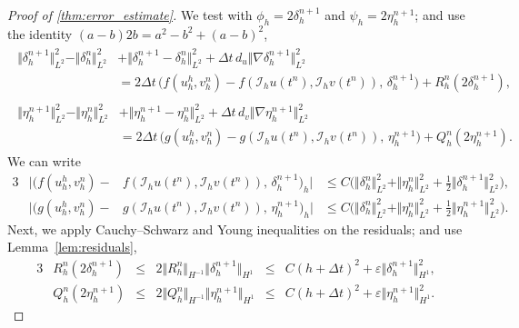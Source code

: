\documentclass[11pt, a4paper]{amsart}
\newcommand{\mI}{\mathcal{I}}
\numberwithin{equation}{section}
\begin{document}
\begin{proof}[Proof of \cref{thm:error_estimate}]
		We test with $\phi_h = 2\delta_h^{n+1}$ and $\psi_h = 2\eta_h^{n+1}$; and use the identity $
		(a - b) 2b = a^2 - b^2 + (a-b)^2$,
		\begin{align*}
			\begin{split}
				\Vert \delta_h^{n+1}\Vert_{L^2}^2 -  \Vert \delta_h^{n}\Vert_{L^2}^2 &+\Vert \delta_h^{n+1} - \delta_h^{n}\Vert_{L^2}^2 + \Delta t\, d_u \Vert \nabla \delta_h^{n+1}\Vert_{L^2}^2
				\\ 
				&=    2\Delta t \,\big(f(u_h^h,v_h^n)- f(\mI_h u(t^n),\mI_h v(t^n)),\, \delta_h^{n+1}\big) + R_h^n(2\delta_h^{n+1}),
			\end{split}  
			\\[5pt]
			\begin{split}
				\Vert \eta_h^{n+1}\Vert_{L^2}^2 - \Vert \eta_h^{n}\Vert_{L^2}^2 &+	\Vert \eta_h^{n+1} - \eta_h^{n}\Vert_{L^2}^2+\Delta t \, d_v  \Vert \nabla \eta_h^{n+1}\Vert_{L^2}^2 
				\\
				&= 2\Delta t\, \big(g(u_h^h,v_h^n)- g(\mI_h u(t^n),\mI_h v(t^n)),\, \eta_h^{n+1}\big) + Q_h^n(2\eta_h^{n+1}).
			\end{split}
		\end{align*}
		We can write 
		\begin{alignat*}{3}
			&\big\vert \big(f(u_h^h,v_h^n)- &f(\mI_h u(t^n),\mI_h v(t^n)), \, \delta_h^{n+1}\big)_h\big\vert &\leq C\big( \Vert \delta_h^{n}\Vert_{L^2}^2 + \Vert \eta_h^{n}\Vert_{L^2}^2 + \tfrac12\Vert \delta_h^{n+1}\Vert_{L^2}^2\big),
			\\
			&\big\vert (g(u_h^h,v_h^n)- &g(\mI_h u(t^n),\mI_h v(t^n)), \,\eta_h^{n+1}\big)_h\big\vert &\leq C\big( \Vert \delta_h^{n}\Vert_{L^2}^2 + \Vert \eta_h^{n}\Vert_{L^2}^2 + \tfrac12\Vert \eta_h^{n+1}\Vert_{L^2}^2\big).
		\end{alignat*}
		Next, we apply Cauchy--Schwarz and Young inequalities on the residuals; and use Lemma~\ref{lem:residuals},
		\begin{alignat*}{3}
			&R_h^n(2\delta_h^{n+1})&{}\leq{} &2\Vert R_h^n\Vert_{H^{-1}}\Vert \delta_h^{n+1}\Vert_{H^{1}}&{}\leq {}&C(h + \Delta t)^2 + \varepsilon \Vert \delta_h^{n+1}\Vert_{H^{1}}^2,
			\\
			&Q_h^n(2\eta_h^{n+1})&{}\leq {}&2\Vert Q_h^n\Vert_{H^{-1}}\Vert \eta_h^{n+1}\Vert_{H^{1}}&{}\leq {}&C(h + \Delta t)^2 + \varepsilon \Vert \eta_h^{n+1}\Vert_{H^{1}}^2.
		\end{alignat*}
		

\end{proof}
\end{document}

